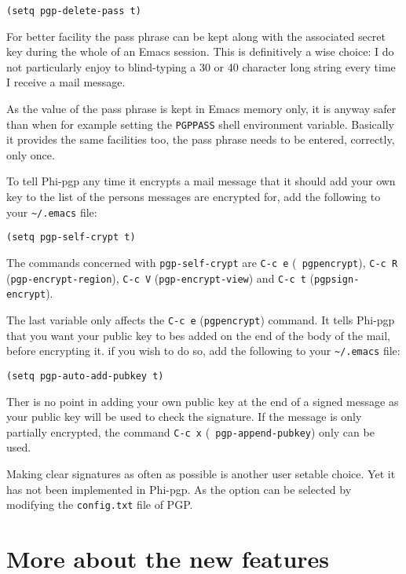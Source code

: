 \begin{verbatim}
(setq pgp-delete-pass t)
\end{verbatim}

For  better  facility  the pass phrase  can   be kept  along with  the
associated secret key  during the whole of an  Emacs session.  This is
definitively  a   wise  choice:  I  do    not  particularly  enjoy  to
blind-typing a 30  or 40 character long  string every time I receive a
mail message.

As  the value of the  pass phrase is kept  in Emacs memory only, it is
anyway safer  than when  for  example setting the {\tt  PGPPASS} shell
environment variable. Basically it  provides the same facilities  too,
the pass phrase needs to be entered, correctly, only once.

\medskip
To tell Phi-pgp any time it encrypts a mail message that it should add
your own key  to the list of  the persons messages  are encrypted for,
add the following to your \verb+~/.emacs+ file:

\begin{verbatim}
(setq pgp-self-crypt t)
\end{verbatim}

The commands concerned with {\tt  pgp-self-crypt} are {\tt C-c e}  ({\tt
pgp\-encrypt}), {\tt C-c~R}  ({\tt pgp-encrypt-region}),  {\tt C-c  V}
({\tt pgp-encrypt-view}) and {\tt C-c t} ({\tt pgp\-sign-encrypt}).

\medskip
The last variable  only affects the  {\tt C-c e} ({\tt  pgp\-encrypt})
command. It  tells Phi-pgp that you want  your public key to bes added
on the end of the body of the mail, before encrypting  it. if you wish
to do so, add the following to your \verb+~/.emacs+ file:

\begin{verbatim}
(setq pgp-auto-add-pubkey t)
\end{verbatim}

Ther is no point in adding your own public key at  the end of a signed
message as your public key will be used to check the signature. If the
message  is only  partially  encrypted, the  command {\tt C-c~x} ({\tt
pgp-append-pubkey}) only can be used.

\medskip
Making  clear signatures as often as  possible is another user setable
choice. Yet it has not been implemented  in Phi-pgp. As the option can
be selected by modifying the {\tt config.txt} file of PGP.

\section{More about the new features}

